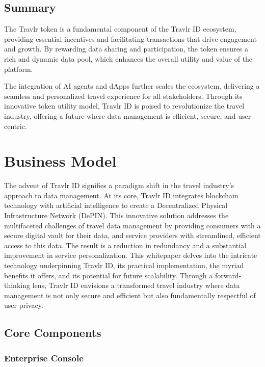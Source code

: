 \documentclass{article}
\begin{document}
\subsection{Summary}

The Travlr token is a fundamental component of the Travlr ID ecosystem, providing essential incentives and facilitating transactions that drive engagement and growth. By rewarding data sharing and participation, the token ensures a rich and dynamic data pool, which enhances the overall utility and value of the platform. 

The integration of AI agents and dApps further scales the ecosystem, delivering a seamless and personalized travel experience for all stakeholders. Through its innovative token utility model, Travlr ID is poised to revolutionize the travel industry, offering a future where data management is efficient, secure, and user-centric.

\newpage

\section{Business Model}

The advent of Travlr ID signifies a paradigm shift in the travel industry's approach to data management. At its core, Travlr ID integrates blockchain technology with artificial intelligence to create a Decentralized Physical Infrastructure Network (DePIN). This innovative solution addresses the multifaceted challenges of travel data management by providing consumers with a secure digital vault for their data, and service providers with streamlined, efficient access to this data. The result is a reduction in redundancy and a substantial improvement in service personalization. This whitepaper delves into the intricate technology underpinning Travlr ID, its practical implementation, the myriad benefits it offers, and its potential for future scalability. Through a forward-thinking lens, Travlr ID envisions a transformed travel industry where data management is not only secure and efficient but also fundamentally respectful of user privacy.

\subsection{Core Components}

\subsubsection{Enterprise Console}
\end{document}

